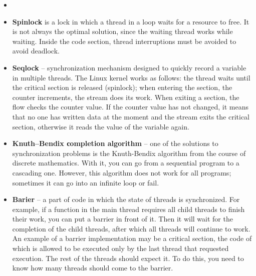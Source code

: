 {\begin{itemize}
			\item{}
			\item\textbf{Spinlock} is a  lock in which a thread in a loop waits for a resource to free. It is not always the optimal solution, since the waiting thread works while waiting. Inside the code section, thread interruptions must be avoided to avoid deadlock.
			\item\textbf{Seqlock} – synchronization mechanism designed to quickly record a variable in multiple threads. The Linux kernel works as follows: the thread waits until the critical section is released (spinlock); when entering the section, the counter increments, the stream does its work. When exiting a section, the flow checks the counter value. If the counter value has not changed, it means that no one has written data at the moment and the stream exits the critical section, otherwise it reads the value of the variable again.
			\item\textbf{Knuth–Bendix сompletion algorithm} – one of the solutions to synchronization problems is the Knuth-Bendix algorithm from the course of discrete mathematics. With it, you can go from a sequential program to a cascading one. However, this algorithm does not work for all programs; sometimes it can go into an infinite loop or fail.
			\item\textbf{Barier} – a part of code in which the state of threads is synchronized. For example, if a function in the main thread requires all child threads to finish their work, you can put a barrier in front of it. Then it will wait for the completion of the child threads, after which all threads will continue to work. An example of a barrier implementation may be a critical section, the code of which is allowed to be executed only by the last thread that requested execution. The rest of the threads should expect it. To do this, you need to know how many threads should come to the barrier.

\end{itemize}}

